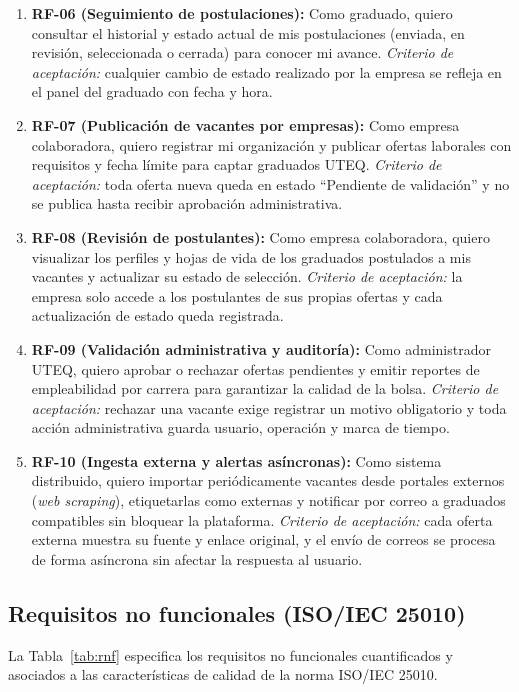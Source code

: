 \documentclass[11pt,a4paper]{article}
\begin{document}
\begin{enumerate}
    \item \textbf{RF-06 (Seguimiento de postulaciones):} Como graduado, quiero consultar el historial y estado actual de mis postulaciones (enviada, en revisión, seleccionada o cerrada) para conocer mi avance. \textit{Criterio de aceptación:} cualquier cambio de estado realizado por la empresa se refleja en el panel del graduado con fecha y hora.
    \item \textbf{RF-07 (Publicación de vacantes por empresas):} Como empresa colaboradora, quiero registrar mi organización y publicar ofertas laborales con requisitos y fecha límite para captar graduados UTEQ. \textit{Criterio de aceptación:} toda oferta nueva queda en estado ``Pendiente de validación'' y no se publica hasta recibir aprobación administrativa.
    \item \textbf{RF-08 (Revisión de postulantes):} Como empresa colaboradora, quiero visualizar los perfiles y hojas de vida de los graduados postulados a mis vacantes y actualizar su estado de selección. \textit{Criterio de aceptación:} la empresa solo accede a los postulantes de sus propias ofertas y cada actualización de estado queda registrada.
    \item \textbf{RF-09 (Validación administrativa y auditoría):} Como administrador UTEQ, quiero aprobar o rechazar ofertas pendientes y emitir reportes de empleabilidad por carrera para garantizar la calidad de la bolsa. \textit{Criterio de aceptación:} rechazar una vacante exige registrar un motivo obligatorio y toda acción administrativa guarda usuario, operación y marca de tiempo.
    \item \textbf{RF-10 (Ingesta externa y alertas asíncronas):} Como sistema distribuido, quiero importar periódicamente vacantes desde portales externos (\textit{web scraping}), etiquetarlas como externas y notificar por correo a graduados compatibles sin bloquear la plataforma. \textit{Criterio de aceptación:} cada oferta externa muestra su fuente y enlace original, y el envío de correos se procesa de forma asíncrona sin afectar la respuesta al usuario.
\end{enumerate}

\subsection{Requisitos no funcionales (ISO/IEC 25010)}

La Tabla~\ref{tab:rnf} especifica los requisitos no funcionales cuantificados y asociados a las características de calidad de la norma ISO/IEC 25010.
\end{document}
